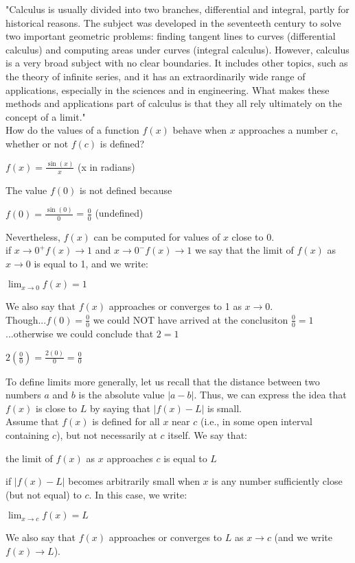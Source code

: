 \documentclass{article}
\begin{document}
"Calculus is usually divided into two branches, differential and integral, partly for historical reasons. The subject was developed in the seventeeth century to solve two important geometric problems: finding tangent lines to curves (differential calculus) and computing areas under curves (integral calculus). However, calculus is a very broad subject with no clear boundaries. It includes other topics, such as the theory of infinite series, and it has an extraordinarily wide range of applications, especially in the sciences and in engineering. What makes these methods and applications part of calculus is that they all rely ultimately on the concept of a limit."\\

\noindent How do the values of a function $f(x)$ behave when $x$ approaches a number $c$, whether or not $f(c)$ is defined?\\

\begin{center}$f(x) = \frac{\sin(x)}{x}$ (x in radians)\end{center}
The value $f(0)$ is not defined because
\begin{center}$f(0) = \frac{\sin(0)}{0}$ = $\frac{0}{0}$ (undefined)\end{center}
Nevertheless, $f(x)$ can be computed for values of $x$ close to 0.\\

if $x \to 0^+ f(x) \to 1$ and $x \to 0^- f(x) \to 1$ we say that the limit of $f(x)$ as $x \to 0$ is equal to 1, and we write:
\begin{center}$\lim_{x \to 0}f(x) = 1$\end{center}
We also say that $f(x)$ approaches or converges to 1 as $x \to 0$.\\

\noindent Though...$f(0) = \frac{0}{0}$ we could NOT have arrived at the conclusiton $\frac{0}{0} = 1$...otherwise we could conclude that $2=1$
\begin{center}$2(\frac{0}{0}) = \frac{2(0)}{0} = \frac{0}{0}$\end{center}

To define limits more generally, let us recall that the distance between two numbers $a$ and $b$ is the absolute value $\left|a-b\right|$. Thus, we can express the idea that $f(x)$ is close to $L$ by saying that $\left|f(x) - L\right|$ is small.\\

Assume that $f(x)$ is defined for all $x$ near $c$ (i.e., in some open interval containing $c$), but not necessarily at $c$ itself. We say that:
\begin{center}the limit of $f(x)$ as $x$ approaches $c$ is equal to $L$\end{center}
if $\left|f(x) - L\right|$ becomes arbitrarily small when $x$ is any number sufficiently close (but not equal) to $c$. In this case, we write:
\begin{center}$\lim_{x \to c}f(x) = L$\end{center}
We also say that $f(x)$ approaches or converges to $L$ as $x \to c$ (and we write $f(x) \to L$).\\
\end{document}
